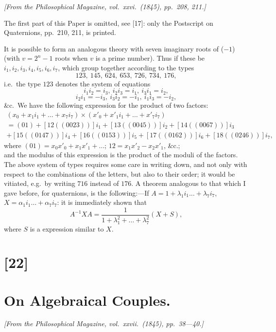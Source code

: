 \documentclass[11pt,a4paper]{book}
\begin{document}
\textit{[From the Philosophical Magazine, vol.~xxvi.~(1845), pp.~208, 211.]}

\bigskip
\setcounter{page}{127}

The first part of this Paper is omitted, see [17]: only the Postscript on Quaternions, pp.~210, 211, is printed.

It is possible to form an analogous theory with seven imaginary roots of ($-1$)
(with $v = 2^n - 1$ roots when $v$ is a prime number). Thus if these be $i_1, i_2, i_3, i_4, i_5, i_6, i_7$,
which group together according to the types
\[
123,\ 145,\ 624,\ 653,\ 726,\ 734,\ 176,
\]
i.e.\ the type $123$ denotes the system of equations
\[
i_1 i_2 = i_3,\ i_2 i_3 = i_1,\ i_3 i_1 = i_2,
\]
\[
i_2 i_1 = -i_3,\ i_3 i_2 = -i_1,\ i_1 i_3 = -i_2,
\]
\&c.\ We have the following expression for the product of two factors:
\begin{multline*}
(x_0 + x_1 i_1 + \ldots + x_7 i_7) \times (x'_0 + x'_1 i_1 + \ldots + x'_7 i_7)\\
= (01) + [12 ((0023))] i_1 + [13 ((0045))] i_2 + [14 ((0067))] i_3\\
+ [15 ((0147))] i_4 + [16 ((0153))] i_5 + [17 ((0162))] i_6 + [18 ((0246))] i_7,
\end{multline*}
where $(01) = x_0 x'_0 + x_1 x'_1 + \ldots$; $12 = x_1 x'_2 - x_2 x'_1$, \&c.;\\
and the modulus of this expression is the product of the moduli of the factors. The
above system of types requires some care in writing down, and not only with respect
to the combinations of the letters, but also to their order; it would be vitiated, e.g.\ by
writing $716$ instead of $176$. A theorem analogous to that which I gave before, for
quaternions, is the following:---If $A = 1 + \lambda_1 i_1 \ldots + \lambda_7 i_7$, $X = \alpha_1 i_1 \ldots + \alpha_7 i_7$: it is immediately
shown that
\[
A^{-1} X A = \frac{1}{1 + \lambda_1^2 + \ldots + \lambda_7^2} (X + S),
\]
where $S$ is a expression similar to $X$.

\newpage
\section*{[22]}
\section*{On Algebraical Couples.}

\textit{[From the Philosophical Magazine, vol.~xxvii.~(1845), pp.~38---40.]}
\end{document}
